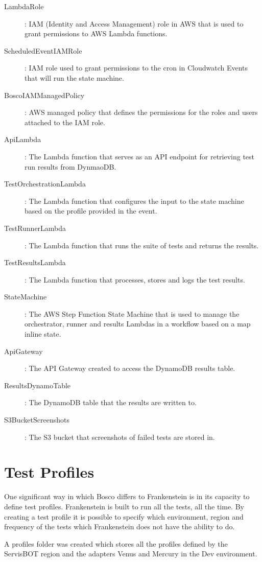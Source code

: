 \documentclass[12pt,a4paper,titlepage]{report}
\begin{document}
\begin{description}
  \item [LambdaRole]: IAM (Identity and Access Management) role in AWS that is used to grant permissions to AWS Lambda functions.
  \item [ScheduledEventIAMRole]: IAM role used to grant permissions to the cron in Cloudwatch Events that will run the state machine.
  \item [BoscoIAMManagedPolicy]: AWS managed policy that defines the permissions for the roles and users attached to the IAM role.
  \item [ApiLambda]: The Lambda function that serves as an API endpoint for retrieving test run results from DynmaoDB.
  \item [TestOrchestrationLambda]: The Lambda function that configures the input to the state machine based on the profile provided in the event.
  \item [TestRunnerLambda]: The Lambda function that runs the suite of tests and returns the results.
  \item [TestResultsLambda]: The Lambda function that processes, stores and logs the test results.
  \item [StateMachine]: The AWS Step Function State Machine that is used to manage the orchestrator, runner and results Lambdas in a workflow based on a map inline state. 
  \item [ApiGateway]: The API Gateway created to access the DynamoDB results table.
  \item [ResultsDynamoTable]: The DynamoDB table that the results are written to.
  \item [S3BucketScreenshots]: The S3 bucket that screenshots of failed tests are stored in.
\end{description}

\section{Test Profiles}
One significant way in which Bosco differs to Frankenstein is in its capacity to define test profiles. 
Frankenstein is built to run all the tests, all the time. By creating a test profile it is possible to specify which 
environment, region and frequency of the tests which Frankenstein does not have the ability to do. 

A profiles folder was created which stores all the profiles defined by the ServisBOT region and the adapters Venus and Mercury in the Dev environment. 
\end{document}
